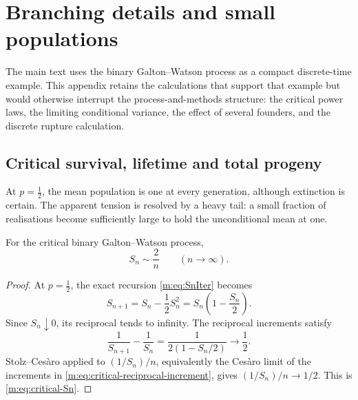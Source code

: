 \FloatBarrier
\chapter{Branching details and small populations}
\label{m:app:branching-details}

The main text uses the binary Galton--Watson process as a compact discrete-time
example.  This appendix retains the calculations that support that example but
would otherwise interrupt the process-and-methods structure: the critical power
laws, the limiting conditional variance, the effect of several founders, and the
discrete rupture calculation.

\section{Critical survival, lifetime and total progeny}
\label{m:app:critical-gw}

At $p=\tfrac12$, the mean population is one at every generation, although
extinction is certain.  The apparent tension is resolved by a heavy tail: a small
fraction of realisations become sufficiently large to hold the unconditional mean
at one.

\begin{proposition}
For the critical binary Galton--Watson process,
\begin{equation}
  S_n\sim\frac{2}{n}
  \qquad(n\to\infty).
  \label{m:eq:critical-Sn}
\end{equation}
\end{proposition}

\begin{proof}
At $p=\tfrac12$, the exact recursion \cref{m:eq:SnIter} becomes
\begin{equation}
  S_{n+1}=S_n-\frac12S_n^2
  =S_n\left(1-\frac{S_n}{2}\right).
  \label{m:eq:critical-recursion}
\end{equation}
Since $S_n\downarrow0$, its reciprocal tends to infinity.  The reciprocal
increments satisfy
\begin{equation}
  \frac{1}{S_{n+1}}-\frac{1}{S_n}
  =\frac{1}{2(1-S_n/2)}\longrightarrow\frac12.
  \label{m:eq:critical-reciprocal-increment}
\end{equation}
Stolz--Ces\`aro applied to $(1/S_n)/n$, equivalently the Ces\`aro limit of the
increments in \cref{m:eq:critical-reciprocal-increment}, gives
$(1/S_n)/n\to1/2$.  This is \cref{m:eq:critical-Sn}.
\end{proof}

